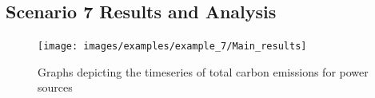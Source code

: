 \documentclass{l4proj}
\begin{document}
\subsection{Scenario 7 Results and Analysis}
\begin{figure}[h]
    \centering
    \texttt{[image: images/examples/example\_7/Main\_results]}
    ~
    \caption{Graphs depicting the timeseries of total carbon emissions for power sources}
    \label{fig:example7_final_results}
\end{figure}

%
%
%



\end{document}
